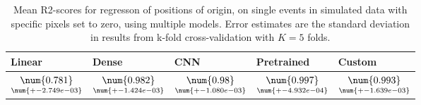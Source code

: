 \begin{table}
\centering
\caption{
Mean R2-scores for regresson of positions of origin, on single events in simulated data with specific pixels
set to zero, using multiple models. 
Error estimates are the standard deviation in results from k-fold cross-validation 
with $K=5$ folds.
}
\label{tab:regression-simulated-single-position-pixelmod-r2}
\begin{tabular}{lllll}
\toprule
                                             Linear &                                               Dense &                                                CNN &                                          Pretrained &                                              Custom \\
\midrule
 $\underset{\num{+- 2.749e-03 }  }{\num{ 0.781 } }$ &  $\underset{\num{+- 1.424e-03 }  }{\num{ 0.982 } }$ &  $\underset{\num{+- 1.080e-03 }  }{\num{ 0.98 } }$ &  $\underset{\num{+- 4.932e-04 }  }{\num{ 0.997 } }$ &  $\underset{\num{+- 1.639e-03 }  }{\num{ 0.993 } }$ \\
\bottomrule
\end{tabular}
\end{table}
